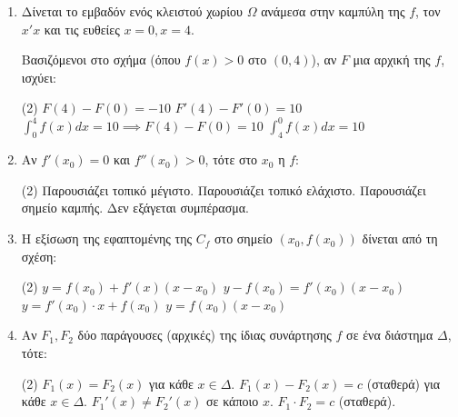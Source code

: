 \documentclass[11pt,a4paper]{article}
\renewcommand{\textdexiakeraia}{}
\newcommand{\dint}{\displaystyle\int}
\begin{document}
\begin{enumerate}[label=\textbf{\arabic*.}, itemsep=4mm]
    \item Δίνεται το εμβαδόν ενός κλειστού χωρίου $\Omega$ ανάμεσα στην καμπύλη της $f$, τον $x'x$ και τις ευθείες $x=0, x=4$.
    \begin{center}
    \end{center}
    Βασιζόμενοι στο σχήμα (όπου $f(x)>0$ στο $(0,4)$), αν $F$ μια αρχική της $f$, ισχύει:
    \begin{tasks}[label=\let\textdexiakeraia\relax\alph*.](2)
        \task $F(4) - F(0) = -10$
        \task $F'(4) - F'(0) = 10$
        \task $\dint_0^4 f(x) dx = 10 \implies F(4) - F(0) = 10$
        \task $\dint_4^0 f(x) dx = 10$
    \end{tasks}



    \item Αν $f'(x_0) = 0$ και $f''(x_0) > 0$, τότε στο $x_0$ η $f$:
    \begin{tasks}[label=\let\textdexiakeraia\relax\alph*.](2)
        \task Παρουσιάζει τοπικό μέγιστο.
        \task Παρουσιάζει τοπικό ελάχιστο.
        \task Παρουσιάζει σημείο καμπής.
        \task Δεν εξάγεται συμπέρασμα.
    \end{tasks}

    \item Η εξίσωση της εφαπτομένης της $C_f$ στο σημείο $(x_0, f(x_0))$ δίνεται από τη σχέση:
    \begin{tasks}[label=\let\textdexiakeraia\relax\alph*.](2)
        \task $y = f(x_0) + f'(x)(x - x_0)$
        \task $y - f(x_0) = f'(x_0)(x - x_0)$
        \task $y = f'(x_0) \cdot x + f(x_0)$
        \task $y = f(x_0)(x - x_0)$
    \end{tasks}

    \item Αν $F_1, F_2$ δύο παράγουσες (αρχικές) της ίδιας συνάρτησης $f$ σε ένα διάστημα $\Delta$, τότε:
    \begin{tasks}[label=\let\textdexiakeraia\relax\alph*.](2)
        \task $F_1(x) = F_2(x)$ για κάθε $x \in \Delta$.
        \task $F_1(x) - F_2(x) = c$ (σταθερά) για κάθε $x \in \Delta$.
        \task $F_1'(x) \ne F_2'(x)$ σε κάποιο $x$.
        \task $F_1 \cdot F_2 = c$ (σταθερά).
    \end{tasks}


\end{enumerate}
\end{document}
